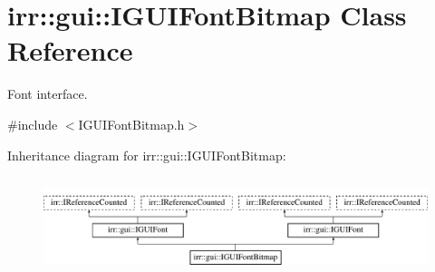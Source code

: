 \hypertarget{classirr_1_1gui_1_1IGUIFontBitmap}{}\section{irr\+:\+:gui\+:\+:I\+G\+U\+I\+Font\+Bitmap Class Reference}
\label{classirr_1_1gui_1_1IGUIFontBitmap}


Font interface.  




{\ttfamily \#include $<$I\+G\+U\+I\+Font\+Bitmap.\+h$>$}

Inheritance diagram for irr\+:\+:gui\+:\+:I\+G\+U\+I\+Font\+Bitmap\+:\begin{figure}[H]
\begin{center}
\leavevmode
\includegraphics[height=2.837838cm]{classirr_1_1gui_1_1IGUIFontBitmap}
\end{center}
\end{figure}
